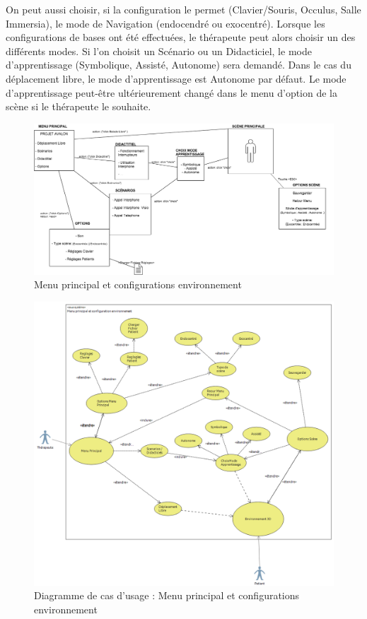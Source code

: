 On peut aussi choisir, si la configuration le permet (Clavier/Souris, Occulus, Salle Immersia), le mode de Navigation (endocendré ou exocentré).
\newline
Lorsque les configurations de bases ont été effectuées, le thérapeute peut alors choisir un des différents modes. Si l'on choisit un Scénario ou un Didacticiel, le mode d'apprentissage (Symbolique, Assisté, Autonome) sera demandé. Dans le cas du déplacement libre, le mode d'apprentissage est Autonome par défaut. Le mode d'apprentissage peut-être ultérieurement changé dans le menu d'option de la scène si le thérapeute le souhaite.
\newline

\begin{figure}[h]
\centering
\includegraphics[width=1\textwidth]{2-Specifications/img-utilisateur/menu.png}
\caption{\label{fig:Menu} Menu principal et configurations environnement }
\end{figure}
\begin{figure}[h]
\centering
\includegraphics[width=1\textwidth]{2-Specifications/img-utilisateur/cas-usage-menu.png}
\caption{\label{fig:CasUsageMenu} Diagramme de cas d'usage : Menu principal et configurations environnement }
\end{figure}
\FloatBarrier

